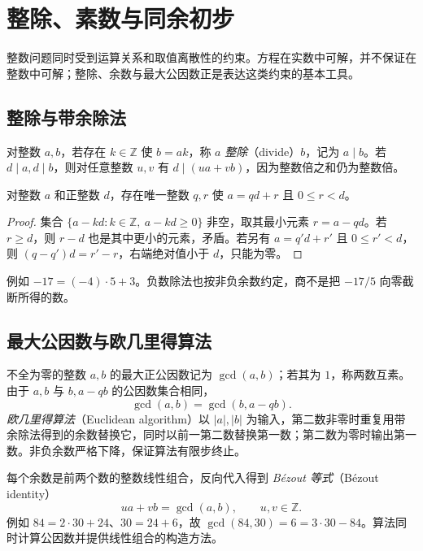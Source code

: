\setcounter{chapter}{2} %
\chapter{整除、素数与同余初步}
\label{chap:em-integers}
整数问题同时受到运算关系和取值离散性的约束。方程在实数中可解，并不保证在整数中可解；整除、余数与最大公因数正是表达这类约束的基本工具。

\section{整除与带余除法}
对整数 $a,b$，若存在 $k\in\mathbb Z$ 使 $b=ak$，称 $a$ \emph{整除}（divide）$b$，记为 $a\mid b$。若 $d\mid a,d\mid b$，则对任意整数 $u,v$ 有 $d\mid(ua+vb)$，因为整数倍之和仍为整数倍。

\begin{theorem}[带余除法]
对整数 $a$ 和正整数 $d$，存在唯一整数 $q,r$ 使 $a=qd+r$ 且 $0\le r<d$。
\end{theorem}
\begin{proof}
集合 $\{a-kd:k\in\mathbb Z,\ a-kd\ge0\}$ 非空，取其最小元素 $r=a-qd$。若 $r\ge d$，则 $r-d$ 也是其中更小的元素，矛盾。若另有 $a=q'd+r'$ 且 $0\le r'<d$，则 $(q-q')d=r'-r$，右端绝对值小于 $d$，只能为零。
\end{proof}
例如 $-17=(-4)\cdot5+3$。负数除法也按非负余数约定，商不是把 $-17/5$ 向零截断所得的数。

\section{最大公因数与欧几里得算法}
不全为零的整数 $a,b$ 的最大正公因数记为 $\gcd(a,b)$；若其为 $1$，称两数互素。由于 $a,b$ 与 $b,a-qb$ 的公因数集合相同，
\[
 \gcd(a,b)=\gcd(b,a-qb).
\]
\emph{欧几里得算法}（Euclidean algorithm）以 $|a|,|b|$ 为输入，第二数非零时重复用带余除法得到的余数替换它，同时以前一第二数替换第一数；第二数为零时输出第一数。非负余数严格下降，保证算法有限步终止。

每个余数是前两个数的整数线性组合，反向代入得到 \emph{Bézout 等式}（Bézout identity）
\begin{equation}\label{eq:em-bezout}
 ua+vb=\gcd(a,b),\qquad u,v\in\mathbb Z.
\end{equation}
例如 $84=2\cdot30+24$、$30=24+6$，故 $\gcd(84,30)=6=3\cdot30-84$。算法同时计算公因数并提供线性组合的构造方法。

